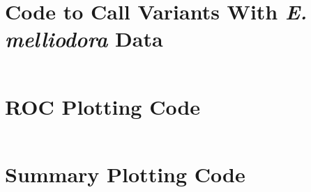 \section{Code to Call Variants With \textit{E. melliodora} Data}
\inputminted[breaklines, breakanywhere, tabsize=2]{Makefile}{ch5/scripts/euc_variants_makefiles.txt}
\section{ROC Plotting Code}
\inputminted[breaklines, breakanywhere, tabsize=2]{r}{ch5/scripts/roc_plots.R}
\section{Summary Plotting Code}
\inputminted[breaklines, breakanywhere, tabsize=2]{r}{ch5/scripts/hapdip_summary_plots.R}

